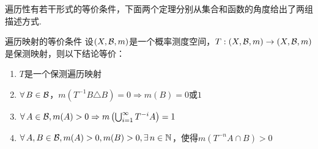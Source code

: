 遍历性有若干形式的等价条件，下面两个定理分别从集合和函数的角度给出了两组描述方式.
\begin{theorem}{遍历映射的等价条件}\label{thm:2.4}
    \wideline
    设$(X,\mathcal{B},m)$是一个概率测度空间，$T:(X,\mathcal{B},m)\to(X,\mathcal{B},m)$是保测映射，则以下结论等价：
    \begin{enumerate}[(1)]
        \item $T$是一个保测遍历映射
        \item $\forall\, B\in\mathcal{B}$，$m \left(T^{-1}B\triangle B\right)=0 \Rightarrow m(B)=0\text{或}1$
        \item $\forall\, A\in\mathcal{B},m(A)>0 \Rightarrow m \left(\bigcup_{i=1}^\infty{T^{-i}A}\right)=1$
        \item $\forall\, A,B\in\mathcal{B},m(A)>0,m(B)>0,\exists\,n\in\mathbb{N}$，使得$m \left(T^{-n}A\cap B\right)>0$
    \end{enumerate}
\end{theorem}
